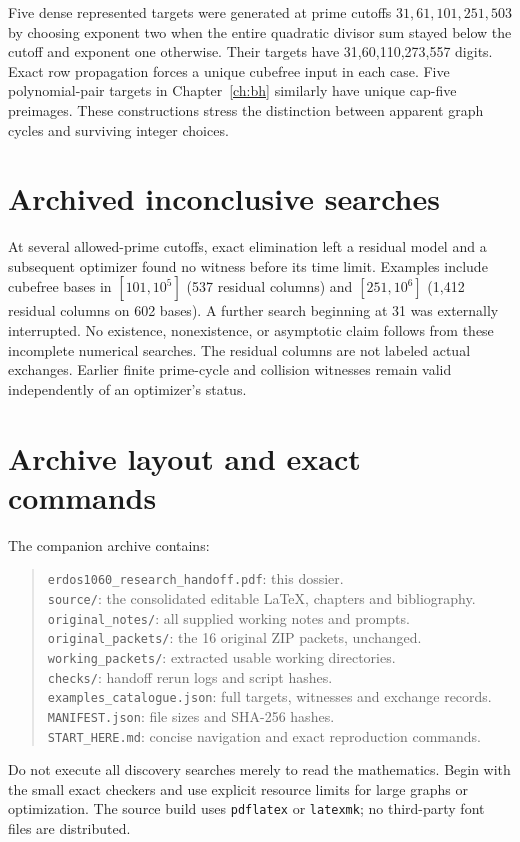 Five dense represented targets were generated at prime cutoffs
$31,61,101,251,503$ by choosing exponent two when the entire quadratic divisor
sum stayed below the cutoff and exponent one otherwise. Their targets have
31,60,110,273,557 digits. Exact row propagation forces a unique cubefree input
in each case. Five polynomial-pair targets in Chapter~\ref{ch:bh} similarly
have unique cap-five preimages. These constructions stress the distinction
between apparent graph cycles and surviving integer choices.

\section{Archived inconclusive searches}
At several allowed-prime cutoffs, exact elimination left a residual model and
a subsequent optimizer found no witness before its time limit. Examples include
cubefree bases in $[101,10^5]$ (537 residual columns) and $[251,10^6]$
(1,412 residual columns on 602 bases). A further search beginning at 31 was
externally interrupted. No existence, nonexistence, or asymptotic claim follows
from these incomplete numerical searches. The residual columns are not labeled
actual exchanges. Earlier finite prime-cycle and collision witnesses remain
valid independently of an optimizer's status.

\section{Archive layout and exact commands}
The companion archive contains:
\begin{quote}
\texttt{erdos1060\_research\_handoff.pdf}: this dossier.\\
\texttt{source/}: the consolidated editable LaTeX, chapters and bibliography.\\
\texttt{original\_notes/}: all supplied working notes and prompts.\\
\texttt{original\_packets/}: the 16 original ZIP packets, unchanged.\\
\texttt{working\_packets/}: extracted usable working directories.\\
\texttt{checks/}: handoff rerun logs and script hashes.\\
\texttt{examples\_catalogue.json}: full targets, witnesses and exchange records.\\
\texttt{MANIFEST.json}: file sizes and SHA-256 hashes.\\
\texttt{START\_HERE.md}: concise navigation and exact reproduction commands.
\end{quote}
Do not execute all discovery searches merely to read the mathematics. Begin with
the small exact checkers and use explicit resource limits for large graphs or
optimization. The source build uses \texttt{pdflatex} or \texttt{latexmk}; no
third-party font files are distributed.
